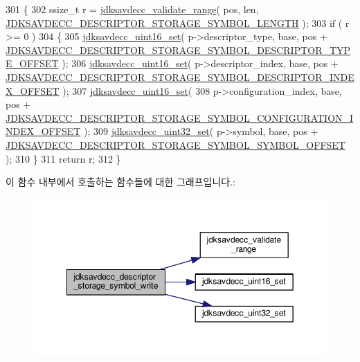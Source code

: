 \begin{DoxyCode}
301 \{
302     ssize\_t r = \hyperlink{group__util_ga9c02bdfe76c69163647c3196db7a73a1}{jdksavdecc\_validate\_range}( pos, len, 
      \hyperlink{group__descriptor__storage__symbol_ga85d377aa36f28a057ec1261c2864dedb}{JDKSAVDECC\_DESCRIPTOR\_STORAGE\_SYMBOL\_LENGTH} );
303     \textcolor{keywordflow}{if} ( r >= 0 )
304     \{
305         \hyperlink{group__endian_ga14b9eeadc05f94334096c127c955a60b}{jdksavdecc\_uint16\_set}( p->descriptor\_type, base, pos + 
      \hyperlink{group__descriptor__storage__symbol_gac45abfc49f02d29c18e2e799d12e805a}{JDKSAVDECC\_DESCRIPTOR\_STORAGE\_SYMBOL\_DESCRIPTOR\_TYPE\_OFFSET}
       );
306         \hyperlink{group__endian_ga14b9eeadc05f94334096c127c955a60b}{jdksavdecc\_uint16\_set}( p->descriptor\_index, base, pos + 
      \hyperlink{group__descriptor__storage__symbol_gafb70b42b94dd5944d92329d2c7a90654}{JDKSAVDECC\_DESCRIPTOR\_STORAGE\_SYMBOL\_DESCRIPTOR\_INDEX\_OFFSET}
       );
307         \hyperlink{group__endian_ga14b9eeadc05f94334096c127c955a60b}{jdksavdecc\_uint16\_set}(
308             p->configuration\_index, base, pos + 
      \hyperlink{group__descriptor__storage__symbol_ga7c33f72a7c2dd5e241efa9c638e810ed}{JDKSAVDECC\_DESCRIPTOR\_STORAGE\_SYMBOL\_CONFIGURATION\_INDEX\_OFFSET}
       );
309         \hyperlink{group__endian_ga59b24ae6f7f47ca4d24ea337543162bf}{jdksavdecc\_uint32\_set}( p->symbol, base, pos + 
      \hyperlink{group__descriptor__storage__symbol_ga45495efb18350bd750d2ca6dac83da4d}{JDKSAVDECC\_DESCRIPTOR\_STORAGE\_SYMBOL\_SYMBOL\_OFFSET} );
310     \}
311     \textcolor{keywordflow}{return} r;
312 \}
\end{DoxyCode}


이 함수 내부에서 호출하는 함수들에 대한 그래프입니다.\+:
\nopagebreak
\begin{figure}[H]
\begin{center}
\leavevmode
\includegraphics[width=349pt]{group__descriptor__storage__symbol_ga6d687c31831e8b24d1245f02ecf9b2e7_cgraph}
\end{center}
\end{figure}


